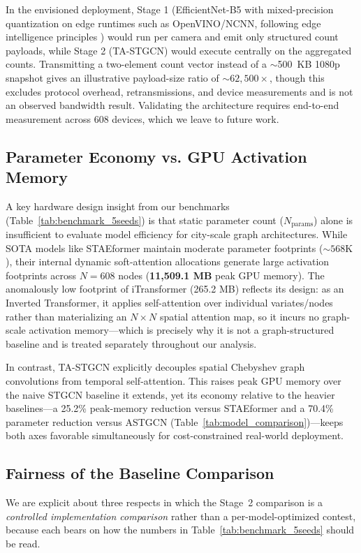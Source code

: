 \documentclass[preprint,12pt]{elsarticle}
\begin{document}
In the envisioned deployment, Stage 1 (EfficientNet-B5 with mixed-precision quantization on edge runtimes such as OpenVINO/NCNN, following edge intelligence principles \citep{edge_intelligence, edge_its_survey}) would run per camera and emit only structured count payloads, while Stage 2 (TA-STGCN) would execute centrally on the aggregated counts. Transmitting a two-element count vector instead of a $\sim$500~KB 1080p snapshot gives an illustrative payload-size ratio of $\sim$$62{,}500\times$, though this excludes protocol overhead, retransmissions, and device measurements and is not an observed bandwidth result. Validating the architecture requires end-to-end measurement across 608 devices, which we leave to future work.

\subsection{Parameter Economy vs. GPU Activation Memory}

A key hardware design insight from our benchmarks (Table~\ref{tab:benchmark_5seeds}) is that static parameter count ($N_{\text{params}}$) alone is insufficient to evaluate model efficiency for city-scale graph architectures. While SOTA models like STAEformer maintain moderate parameter footprints ($\sim 568\text{K}$), their internal dynamic soft-attention allocations generate large activation footprints across $N=608$ nodes (\textbf{11,509.1 MB} peak GPU memory). The anomalously low footprint of iTransformer (265.2 MB) reflects its design: as an Inverted Transformer, it applies self-attention over individual variates/nodes rather than materializing an $N \times N$ spatial attention map, so it incurs no graph-scale activation memory---which is precisely why it is not a graph-structured baseline and is treated separately throughout our analysis.

In contrast, TA-STGCN explicitly decouples spatial Chebyshev graph convolutions from temporal self-attention. This raises peak GPU memory over the naive STGCN baseline it extends, yet its economy relative to the heavier baselines---a 25.2\% peak-memory reduction versus STAEformer and a 70.4\% parameter reduction versus ASTGCN (Table~\ref{tab:model_comparison})---keeps both axes favorable simultaneously for cost-constrained real-world deployment.

\subsection{Fairness of the Baseline Comparison}
\label{sec:fairness}
We are explicit about three respects in which the Stage~2 comparison is a \emph{controlled implementation comparison} rather than a per-model-optimized contest, because each bears on how the numbers in Table~\ref{tab:benchmark_5seeds} should be read.
\end{document}
